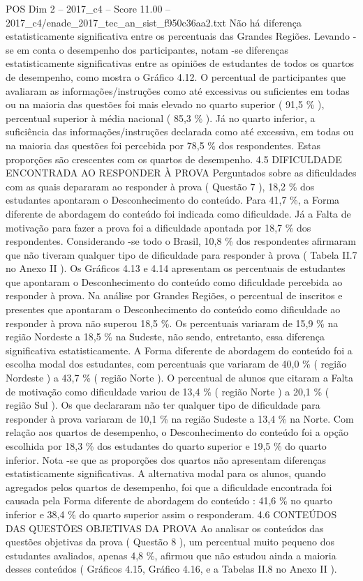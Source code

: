 \begin{textsample}{POS Dim 2 – 2017\_c4 – Score 11.00 – 2017\_c4/enade\_2017\_tec\_an\_sist\_f950c36aa2.txt}
Não há diferença estatisticamente significativa entre os percentuais das Grandes Regiões.
Levando -se em conta o desempenho dos participantes, notam -se diferenças estatisticamente significativas entre as opiniões de estudantes de todos os quartos de desempenho, como mostra o Gráfico 4.12.
O percentual de participantes que avaliaram as informações/instruções como até excessivas ou suficientes em todas ou na maioria das questões foi mais elevado no quarto superior ( 91,5 \% ), percentual superior à média nacional ( 85,3 \% ).
Já no quarto inferior, a suficiência das informações/instruções declarada como até excessiva, em todas ou na maioria das questões foi percebida por 78,5 \% dos respondentes.
Estas proporções são crescentes com os quartos de desempenho. 4.5 DIFICULDADE ENCONTRADA AO RESPONDER À PROVA Perguntados sobre as dificuldades com as quais depararam ao responder à prova ( Questão 7 ), 18,2 \% dos estudantes apontaram o Desconhecimento do conteúdo.
Para 41,7 \%, a Forma diferente de abordagem do conteúdo foi indicada como dificuldade.
Já a Falta de motivação para fazer a prova foi a dificuldade apontada por 18,7 \% dos respondentes.
Considerando -se todo o Brasil, 10,8 \% dos respondentes afirmaram que não tiveram qualquer tipo de dificuldade para responder à prova ( Tabela II.7 no Anexo II ).
Os Gráficos 4.13 e 4.14 apresentam os percentuais de estudantes que apontaram o Desconhecimento do conteúdo como dificuldade percebida ao responder à prova.
Na análise por Grandes Regiões, o percentual de inscritos e presentes que apontaram o Desconhecimento do conteúdo como dificuldade ao responder à prova não superou 18,5 \%.
Os percentuais variaram de 15,9 \% na região Nordeste a 18,5 \% na Sudeste, não sendo, entretanto, essa diferença significativa estatisticamente.
A Forma diferente de abordagem do conteúdo foi a escolha modal dos estudantes, com percentuais que variaram de 40,0 \% ( região Nordeste ) a 43,7 \% ( região Norte ).
O percentual de alunos que citaram a Falta de motivação como dificuldade variou de 13,4 \% ( região Norte ) a 20,1 \% ( região Sul ).
Os que declararam não ter qualquer tipo de dificuldade para responder à prova variaram de 10,1 \% na região Sudeste a 13,4 \% na Norte.
Com relação aos quartos de desempenho, o Desconhecimento do conteúdo foi a opção escolhida por 18,3 \% dos estudantes do quarto superior e 19,5 \% do quarto inferior.
Nota -se que as proporções dos quartos não apresentam diferenças estatisticamente significativas.
A alternativa modal para os alunos, quando agregados pelos quartos de desempenho, foi que a dificuldade encontrada foi causada pela Forma diferente de abordagem do conteúdo : 41,6 \% no quarto inferior e 38,4 \% do quarto superior assim o responderam. 4.6 CONTEÚDOS DAS QUESTÕES OBJETIVAS DA PROVA Ao analisar os conteúdos das questões objetivas da prova ( Questão 8 ), um percentual muito pequeno dos estudantes avaliados, apenas 4,8 \%, afirmou que não estudou ainda a maioria desses conteúdos ( Gráficos 4.15, Gráfico 4.16, e a Tabelas II.8 no Anexo II ).

\end{textsample}
